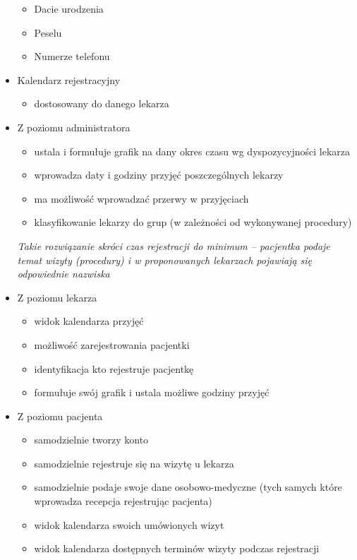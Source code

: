 \documentclass[10pt,a4paper]{article}
\begin{document}
\begin{itemize}
\begin{itemize}
        \item Dacie urodzenia
        \item Peselu
        \item Numerze telefonu
    \end{itemize}
    \item Kalendarz rejestracyjny \begin{itemize}
        \item dostosowany do danego lekarza
    \end{itemize}
    \item Z poziomu administratora \begin{itemize}
        \item ustala i formułuje grafik na dany okres czasu wg dyspozycyjności lekarza
        \item wprowadza daty i godziny przyjęć poszczególnych lekarzy 
        \item ma możliwość wprowadzać przerwy w przyjęciach 
        \item klasyfikowanie lekarzy do grup (w zależności od wykonywanej procedury)
    \end{itemize}
    \emph{Takie rozwiązanie skróci czas rejestracji do minimum – pacjentka podaje temat wizyty (procedury) i w proponowanych lekarzach pojawiają się odpowiednie nazwiska}
    \item Z poziomu lekarza \begin{itemize}
        \item widok kalendarza przyjęć
        \item możliwość zarejestrowania pacjentki 
        \item identyfikacja kto rejestruje pacjentkę
        \item formułuje swój grafik i ustala możliwe godziny przyjęć %
    \end{itemize}
    \item Z poziomu pacjenta \begin{itemize} %
      \item samodzielnie tworzy konto
      \item samodzielnie rejestruje się na wizytę u lekarza
      \item samodzielnie podaje swoje dane osobowo-medyczne (tych samych które wprowadza recepcja rejestrując pacjenta)
      \item widok kalendarza swoich umówionych wizyt
      \item widok kalendarza dostępnych terminów wizyty podczas rejestracji

\end{itemize}
\end{itemize}
\end{document}

